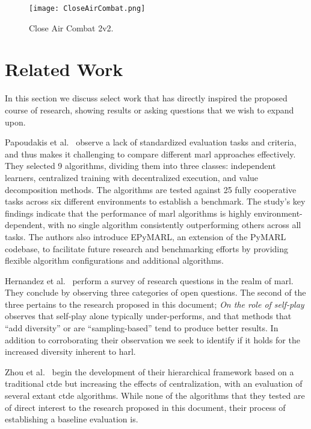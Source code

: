 \begin{figure}[h]
    \centering
    \texttt{[image: CloseAirCombat.png]}
    \caption{Close Air Combat 2v2.}
    \label{fig:CloseAirCombat}
\end{figure}


\section{Related Work}

In this section we discuss select work that has directly inspired the 
proposed course of research, showing results or asking questions that 
we wish to expand upon.


Papoudakis et al.~\cite{papoudakis2021} observe a lack of standardized 
evaluation tasks and criteria, and thus makes it challenging to compare 
different \gls{marl} approaches effectively.
They selected 9 algorithms, dividing them into three classes:
independent learners, centralized training with decentralized execution, 
and value decomposition methods.
The algorithms are tested against 25 fully cooperative tasks across 
six different environments to establish a benchmark.
%
The study's key findings indicate that the performance of 
\gls*{marl} algorithms is highly environment-dependent, 
with no single algorithm consistently outperforming others across all tasks. 
The authors also introduce EPyMARL, an extension of the PyMARL codebase, 
to facilitate future research and benchmarking efforts by providing 
flexible algorithm configurations and additional algorithms.

Hernandez et al.~\cite*{hernandez-leal2019} perform a survey of
research questions in the realm of \gls{marl}.
They conclude by observing three categories of open questions.
% 
The second of the three pertains to the research proposed in this document;
\emph{On the role of self-play} observes that self-play alone
typically under-performs, and that methods that ``add diversity''
or are ``sampling-based'' tend to produce better results.
In addition to corroborating their observation we seek to 
identify if it holds for the increased diversity inherent to \gls{harl}.

Zhou et al.~\cite{zhou2023} begin the development of their hierarchical
framework based on a traditional \gls{ctde} but increasing the effects
of centralization, with an evaluation of several extant \gls{ctde}
algorithms. While none of the algorithms that they tested are of
direct interest to the research proposed in this document,
their process of establishing a baseline evaluation is.

